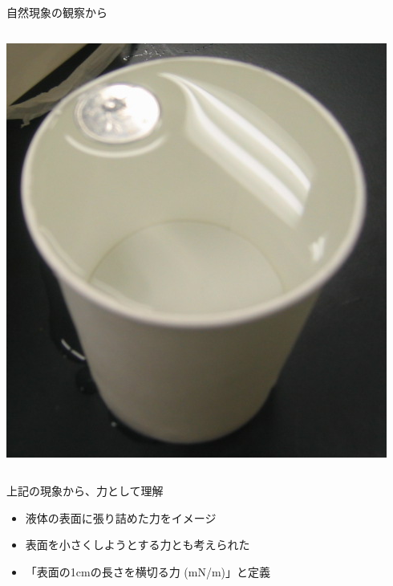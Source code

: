 \documentclass[12pt, dvipdfmx]{beamer}
\begin{document}
\begin{frame}
\begin{block}{自然現象の観察から}
\begin{columns}[c, onlytextwidth]
			\centering
			\includegraphics[width=.41\textwidth]{hyoumen_1.png}
		\end{columns}
	\end{block}

	\begin{exampleblock}{上記の現象から、力として理解}
		\begin{itemize}
			\item 液体の表面に張り詰めた力をイメージ
			\item 表面を小さくしようとする力とも考えられた
			\item 「表面の1cmの長さを横切る力 (mN/m)」と定義
		\end{itemize}
	\end{exampleblock}
\end{frame}
\end{document}
